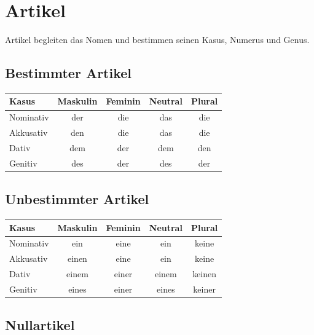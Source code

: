 \chapter{Artikel}
\label{cha:Artikel}

Artikel begleiten das Nomen und bestimmen seinen Kasus, Numerus und Genus.

\section{Bestimmter Artikel}
\label{sec:BestimmterArtikel}

\begin{center}
\begin{tabular}{|l|c|c|c|c|}
\hline
\textbf{Kasus} & \textbf{Maskulin} & \textbf{Feminin} & \textbf{Neutral} & \textbf{Plural} \\ \hline
Nominativ & der & die & das & die \\ \hline
Akkusativ & den & die & das & die \\ \hline
Dativ & dem & der & dem & den \\ \hline
Genitiv & des & der & des & der \\ \hline
\end{tabular}
\end{center}

\section{Unbestimmter Artikel}
\label{sec:UnbestimmterArtikel}

\begin{center}
\begin{tabular}{|l|c|c|c|c|}
\hline
\textbf{Kasus} & \textbf{Maskulin} & \textbf{Feminin} & \textbf{Neutral} & \textbf{Plural} \\ \hline
Nominativ & ein & eine & ein & keine \\ \hline
Akkusativ & einen & eine & ein & keine \\ \hline
Dativ & einem & einer & einem & keinen \\ \hline
Genitiv & eines & einer & eines & keiner \\ \hline
\end{tabular}
\end{center}

\section{Nullartikel}
\label{sec:Nullartikel}

